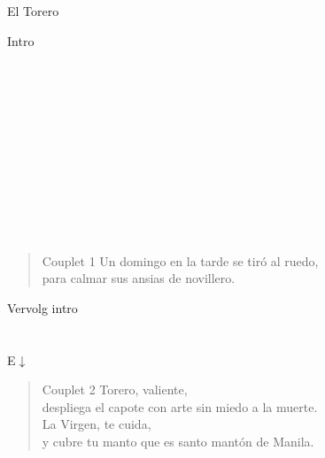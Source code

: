 \begin{song}{El Torero}

\begin{instrumental}{Intro}
 \\
\\
\\
 \measure{} \measure{} \measure*{}\\
 \measure{}  \measure*{}\\
 \measure{} \measure{} \measure*{}\\
 \measure{} \measure{} \measure*{}\\
\measure{} \measure{}  \measure*{}\\
 \measure{} \measure{}
\measure*{}\\
\\
 \\
\\
\end{instrumental}

\begin{verse}{Couplet 1}
 Un domingo en la tarde  se tiró al  ruedo,\\
para calmar sus ansias  de novillero.
\end{verse}

\begin{instrumental}{Vervolg intro}
 \\
\\
\\
 \measure{} \measure{}  E$\downarrow$\\
\end{instrumental}

\begin{verse}{Couplet 2}
Torero, valiente,\\
despliega el capote con arte sin miedo a la muerte.\\
La Virgen, te cuida,\\
y cubre tu manto que es santo mantón de Manila. 
\end{verse}


\end{song}
